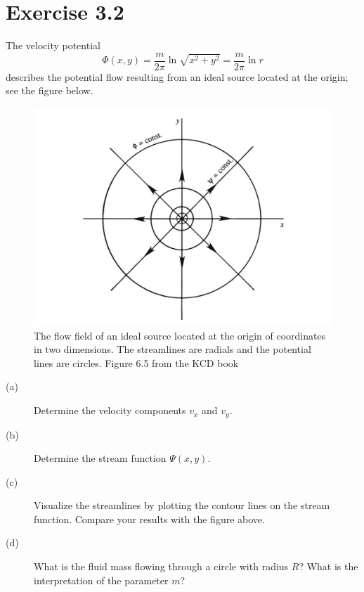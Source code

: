 \documentclass[a4paper, 10pt]{article}
\begin{document}
\section*{Exercise 3.2}
The velocity potential
\begin{equation}
\Phi(x,y) = \frac{m}{2\pi}\ln\sqrt{x^2+y^2}=\frac{m}{2\pi}\ln r
\end{equation}
describes the potential flow resulting from an ideal source located at the origin; see the figure below.

\begin{figure}[h!]
	\centering
	\includegraphics[width=.75\textwidth]{kcd}
	\caption{The flow field of an ideal source located at the origin of coordinates in two dimensions. The streamlines are radials and the potential lines are circles. Figure 6.5 from the KCD book}
\end{figure}

\begin{description}
	\item[(a)]
	Determine the velocity components $v_x$ and $v_y$.
	\item[(b)]
	Determine the stream function $\Psi(x,y)$.
	\item[(c)]
	Visualize the streamlines by plotting the contour lines on the stream function. Compare your results with the figure above.
	\item[(d)]
	What is the fluid mass flowing through a circle with radius $R$? What is the interpretation of the parameter $m$?
\end{description}
\end{document}
